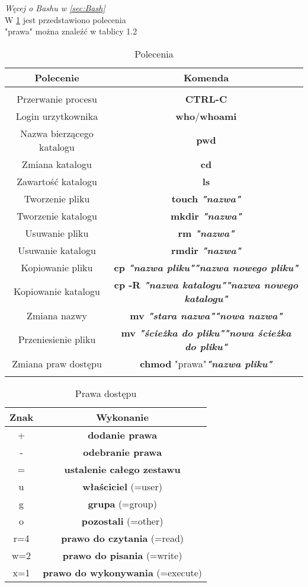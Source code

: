 \documentclass[11pt, a4paper, onecolumn, twoside]{report}
\begin{document}
\textit{Węcej o Bashu w  \ref{sec:Bash}} \\
\newpage
W \ref{tab} jest przedstawiono polecenia \\
"prawa" można znaleźć w tablicy 1.2 \\
\begin{table}
\begin{tabular}{||c||c||}
\hline\hline
\Large Polecenie & \Large Komenda\\\hline\hline
&\\
Przerwanie procesu & \textbf{CTRL-C} \\
Login urzytkownika & \textbf{who}/\textbf{whoami} \\
Nazwa bierzącego katalogu & \textbf{pwd} \\
Zmiana katalogu & \textbf{cd} \\
Zawartość katalogu & \textbf{ls} \\
Tworzenie pliku & \textbf{touch \textit{"nazwa"}} \\
Tworzenie katalogu & \textbf{mkdir \textit{"nazwa"}} \\
Usuwanie pliku & \textbf{rm \textit{"nazwa"}} \\
Usuwanie katalogu & \textbf{rmdir \textit{"nazwa"}} \\
Kopiowanie pliku & \textbf{cp \textit{"nazwa pliku"}\textit{"nazwa nowego pliku"}} \\
Kopiowanie katalogu & \textbf{cp -R \textit{"nazwa katalogu"}\textit{"nazwa nowego katalogu"}}\\
Zmiana nazwy & \textbf{mv \textit{"stara nazwa"}\textit{"nowa nazwa"}} \\
Przeniesienie pliku & \textbf{mv \textit{"ścieżka do pliku"}\textit{"nowa ścieżka do pliku"}} \\
Zmiana praw dostępu & \textbf{chmod} "prawa"\textbf{\textit{"nazwa pliku"}} \\
 & \\\hline\hline
\end{tabular}
\label{tab}
\caption{Polecenia}
\end{table}

\begin{table}
\begin{tabular}{c|c}
Znak & Wykonanie \\\hline
+ & \textbf{dodanie prawa}\\
- &  \textbf{odebranie prawa}\\
= & \textbf{ustalenie całego zestawu}\\
\hline
u & \textbf{właściciel} (=user)\\
g & \textbf{grupa} (=group)\\
o & \textbf{pozostali} (=other)\\
\hline
r=4 & \textbf{prawo do czytania} (=read)\\
w=2 & \textbf{prawo do pisania} (=write)\\
x=1 & \textbf{prawo do wykonywania} (=execute)\\
\hline
\end{tabular}
\caption{Prawa dostępu}
\end{table}
\end{document}
